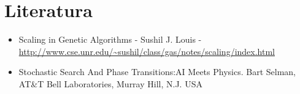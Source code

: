 \documentclass[12pt,oneside,a4paper]{article}
\begin{document}
\section{Literatura}
\begin{itemize}
\item Scaling in Genetic Algorithms - Sushil J. Louis - \url{http://www.cse.unr.edu/~sushil/class/gas/notes/scaling/index.html}
\item Stochastic Search And Phase Transitions:AI Meets Physics. Bart Selman, AT\&T Bell Laboratories, Murray Hill, N.J. USA
\end{itemize}


\renewcommand{\refname}{Literatura}

{
 
}
\end{document}
